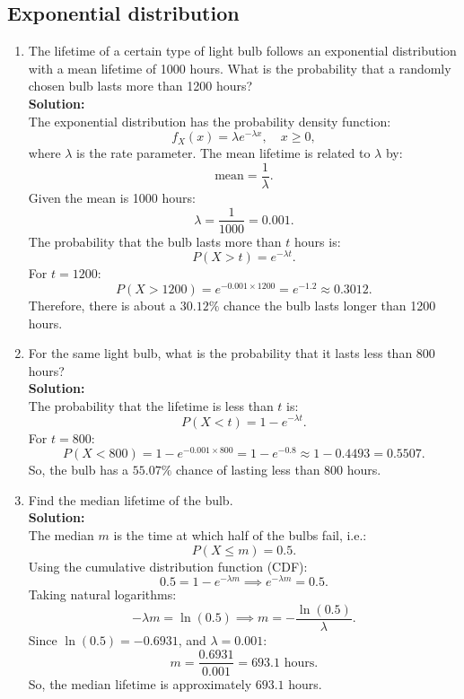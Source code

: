 \documentclass{book}
\begin{document}
\subsection*{Exponential distribution}

\begin{enumerate}

    \item The lifetime of a certain type of light bulb follows an exponential distribution with a mean lifetime of 1000 hours. What is the probability that a randomly chosen bulb lasts more than 1200 hours? \\
    
    \textbf{Solution:} \\
    
    The exponential distribution has the probability density function:
    \[
    f_X(x) = \lambda e^{-\lambda x}, \quad x \geq 0,
    \]
    where \(\lambda\) is the rate parameter. The mean lifetime is related to \(\lambda\) by:
    \[
    \text{mean} = \frac{1}{\lambda}.
    \]
    Given the mean is 1000 hours:
    \[
    \lambda = \frac{1}{1000} = 0.001.
    \]
    The probability that the bulb lasts more than \(t\) hours is:
    \[
    P(X > t) = e^{-\lambda t}.
    \]
    For \(t = 1200\):
    \[
    P(X > 1200) = e^{-0.001 \times 1200} = e^{-1.2} \approx 0.3012.
    \]
    Therefore, there is about a \(\boxed{30.12\%}\) chance the bulb lasts longer than 1200 hours.

    \item For the same light bulb, what is the probability that it lasts less than 800 hours? \\
    
    \textbf{Solution:} \\
    
    The probability that the lifetime is less than \(t\) is:
    \[
    P(X < t) = 1 - e^{-\lambda t}.
    \]
    For \(t = 800\):
    \[
    P(X < 800) = 1 - e^{-0.001 \times 800} = 1 - e^{-0.8} \approx 1 - 0.4493 = 0.5507.
    \]
    So, the bulb has a \(\boxed{55.07\%}\) chance of lasting less than 800 hours.

    \item Find the median lifetime of the bulb. \\
    
    \textbf{Solution:} \\
    
    The median \(m\) is the time at which half of the bulbs fail, i.e.:
    \[
    P(X \leq m) = 0.5.
    \]
    Using the cumulative distribution function (CDF):
    \[
    0.5 = 1 - e^{-\lambda m} \implies e^{-\lambda m} = 0.5.
    \]
    Taking natural logarithms:
    \[
    -\lambda m = \ln(0.5) \implies m = -\frac{\ln(0.5)}{\lambda}.
    \]
    Since \(\ln(0.5) = -0.6931\), and \(\lambda = 0.001\):
    \[
    m = \frac{0.6931}{0.001} = 693.1 \text{ hours}.
    \]
    So, the median lifetime is approximately \(\boxed{693.1}\) hours.
\end{enumerate}
\end{document}
